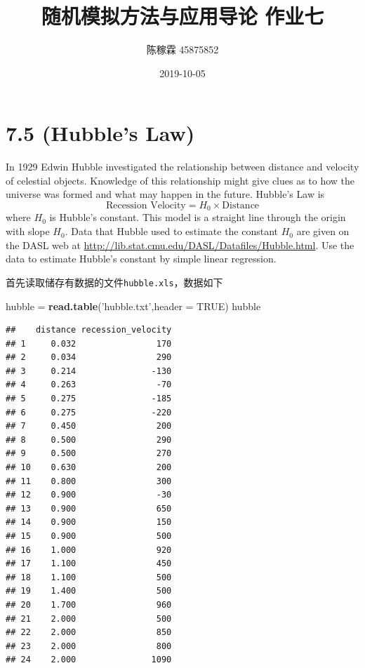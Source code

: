 \documentclass[]{article}
\title{随机模拟方法与应用导论 作业七}
\author{陈稼霖 45875852}
\date{2019-10-05}
\newenvironment{Shaded}{\begin{snugshade}}{\end{snugshade}}
\newcommand{\DataTypeTok}[1]{\textcolor[rgb]{0.13,0.29,0.53}{#1}}
\newcommand{\KeywordTok}[1]{\textcolor[rgb]{0.13,0.29,0.53}{\textbf{#1}}}
\newcommand{\NormalTok}[1]{#1}
\newcommand{\OtherTok}[1]{\textcolor[rgb]{0.56,0.35,0.01}{#1}}
\newcommand{\StringTok}[1]{\textcolor[rgb]{0.31,0.60,0.02}{#1}}
\begin{document}
\maketitle

\hypertarget{hubbles-law}{%
\section{7.5 (Hubble's Law)}\label{hubbles-law}}

In 1929 Edwin Hubble investigated the relationship between distance and
velocity of celestial objects. Knowledge of this relationship might give
clues as to how the universe was formed and what may happen in the
future. Hubble's Law is \[
\text{Recession Velocity}=H_0\times\text{Distance}
\] where \(H_0\) is Hubble's constant. This model is a straight line
through the origin with slope \(H_0\). Data that Hubble used to estimate
the constant \(H_0\) are given on the DASL web at
\url{http://lib.stat.cmu.edu/DASL/Datafiles/Hubble.html}. Use the data
to estimate Hubble's constant by simple linear regression.

首先读取储存有数据的文件\texttt{hubble.xls}，数据如下

\begin{Shaded}
\begin{Highlighting}[]
\NormalTok{hubble =}\StringTok{ }\KeywordTok{read.table}\NormalTok{(}\StringTok{'hubble.txt'}\NormalTok{,}\DataTypeTok{header =} \OtherTok{TRUE}\NormalTok{)}
\NormalTok{hubble}
\end{Highlighting}
\end{Shaded}

\begin{verbatim}
##    distance recession_velocity
## 1     0.032                170
## 2     0.034                290
## 3     0.214               -130
## 4     0.263                -70
## 5     0.275               -185
## 6     0.275               -220
## 7     0.450                200
## 8     0.500                290
## 9     0.500                270
## 10    0.630                200
## 11    0.800                300
## 12    0.900                -30
## 13    0.900                650
## 14    0.900                150
## 15    0.900                500
## 16    1.000                920
## 17    1.100                450
## 18    1.100                500
## 19    1.400                500
## 20    1.700                960
## 21    2.000                500
## 22    2.000                850
## 23    2.000                800
## 24    2.000               1090
\end{verbatim}
\end{document}

